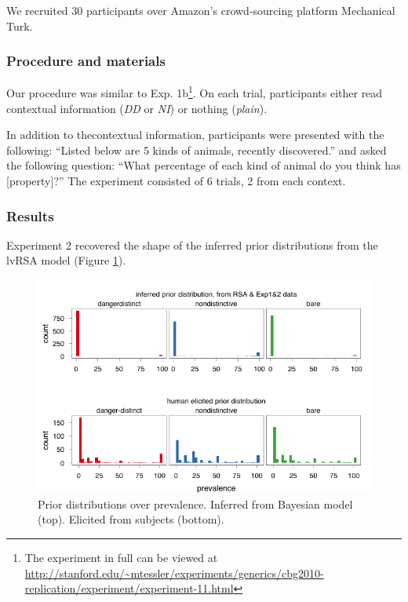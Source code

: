 \documentclass[10pt,letterpaper]{article}
\begin{document}
We recruited 30 participants over Amazon's crowd-sourcing platform Mechanical Turk. 

\subsubsection{Procedure and materials}

Our procedure was similar to Exp. 1b\footnote{The experiment in full can be viewed at \url{http://stanford.edu/~mtessler/experiments/generics/cbg2010-replication/experiment/experiment-11.html}}. On each trial, participants either read contextual information (\emph{DD} or \emph{NI}) or nothing (\emph{plain}). 

In addition to thecontextual information, participants were presented with the following: ``Listed below are 5 kinds of animals, recently discovered.'' and asked the following question: ``What percentage of each kind of animal do you think has [property]?'' The experiment consisted of 6 trials, 2 from each context. 

\subsubsection{Results}

Experiment 2 recovered the shape of the inferred prior distributions from the lvRSA model (Figure \ref{fig:modeldatapriors}).

\begin{figure}
\centering
    \includegraphics[width=\columnwidth]{exp3hist_inferredMeanPriorExp1_2}
    \caption{Prior distributions over prevalence. Inferred from Bayesian model (top). Elicited from subjects (bottom).}
  \label{fig:modeldatapriors}
\end{figure}
\end{document}
